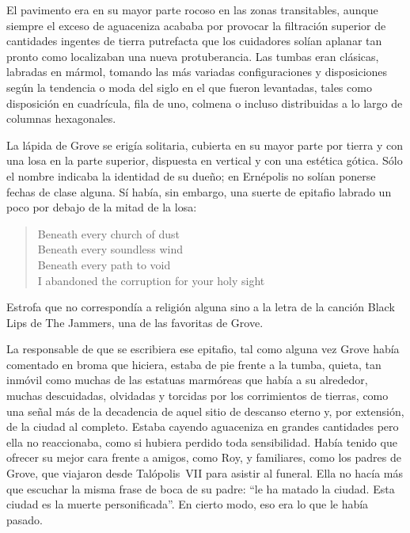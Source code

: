El pavimento era en su mayor parte rocoso en las zonas transitables, aunque siempre el exceso de aguaceniza acababa por provocar la filtración superior de cantidades ingentes de tierra putrefacta que los cuidadores solían aplanar tan pronto como localizaban una nueva protuberancia. Las tumbas eran clásicas, labradas en mármol, tomando las más variadas configuraciones y disposiciones según la tendencia o moda del siglo en el que fueron levantadas, tales como disposición en cuadrícula, fila de uno, colmena o incluso distribuidas a lo largo de columnas hexagonales.

La lápida de Grove se erigía solitaria, cubierta en su mayor parte por tierra y con una losa en la parte superior, dispuesta en vertical y con una estética gótica. Sólo el nombre indicaba la identidad de su dueño; en Ernépolis no solían ponerse fechas de clase alguna. Sí había, sin embargo, una suerte de epitafio labrado un poco por debajo de la mitad de la losa:

\begin{verse}
    \begin{em}
        Beneath every church of dust\\
        Beneath every soundless wind\\
        Beneath every path to void\\
        I abandoned the corruption for your holy sight\\
    \end{em}
\end{verse}

Estrofa que no correspondía a religión alguna sino a la letra de la canción Black Lips de The Jammers, una de las favoritas de Grove.

La responsable de que se escribiera ese epitafio, tal como alguna vez Grove había comentado en broma que hiciera, estaba de pie frente a la tumba, quieta, tan inmóvil como muchas de las estatuas marmóreas que había a su alrededor, muchas descuidadas, olvidadas y torcidas por los corrimientos de tierras, como una señal más de la decadencia de aquel sitio de descanso eterno y, por extensión, de la ciudad al completo. Estaba cayendo aguaceniza en grandes cantidades pero ella no reaccionaba, como si hubiera perdido toda sensibilidad. Había tenido que ofrecer su mejor cara frente a amigos, como Roy, y familiares, como los padres de Grove, que viajaron desde Talópolis~VII para asistir al funeral. Ella no hacía más que escuchar la misma frase de boca de su padre: “le ha matado la ciudad. Esta ciudad es la muerte personificada”. En cierto modo, eso era lo que le había pasado.

